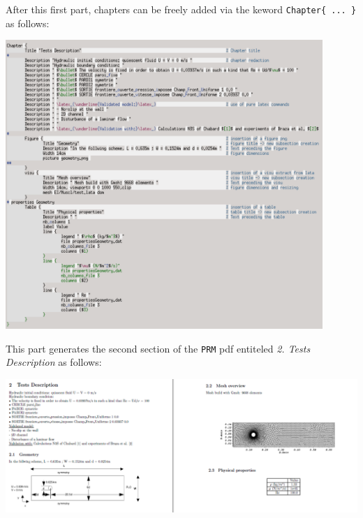 After this first part, chapters can be freely added via the keword \verb"Chapter{ ... }" as follows:\newline
\begin{center}\includegraphics[width=12cm]{tools/chapter_PRM_1.png}\end{center}
\begin{center}\end{center}

This part generates the second section of the \texttt{PRM} pdf entiteled \textit{2. Tests Description} as follows:\newline
\begin{center}\includegraphics[width=15cm]{tools/chapter_PRM_1_pdf.png}\end{center}
\begin{center}\end{center}

